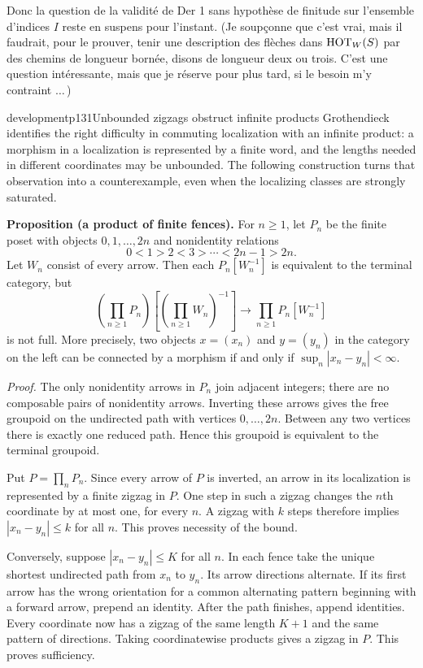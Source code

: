 Donc la question de la validité de Der 1 sans hypothèse de finitude sur l'ensemble d'indices $I$
reste en suspens pour l'instant. (Je soupçonne que c'est vrai, mais il faudrait, pour le prouver, tenir une description des flèches dans $\mathrm{HOT}_W(S)$ par des chemins de longueur bornée, disons de longueur deux ou trois. C'est une question intéressante, mais que je réserve pour plus tard, si le besoin m'y contraint $\ldots\,$)

\begin{dcomment}{development}{p131}{Unbounded zigzags obstruct infinite products}
Grothendieck identifies the right difficulty in commuting localization with an infinite product: a morphism in a localization is represented by a finite word, and the lengths needed in different coordinates may be unbounded. The following construction turns that observation into a counterexample, even when the localizing classes are strongly saturated.

\textbf{Proposition (a product of finite fences).}\ours
For $n\geq1$, let $P_n$ be the finite poset with objects $0,1,\ldots,2n$ and nonidentity relations
\[
 0<1>2<3>\cdots<2n-1>2n.
\]
Let $W_n$ consist of every arrow. Then each $P_n[W_n^{-1}]$ is equivalent to the terminal category, but
\[
 \left(\prod_{n\geq1}P_n\right)
 \left[\left(\prod_{n\geq1}W_n\right)^{-1}\right]
 \longrightarrow \prod_{n\geq1}P_n[W_n^{-1}]
\]
is not full. More precisely, two objects $x=(x_n)$ and $y=(y_n)$ in the category on the left can be connected by a morphism if and only if $\sup_n|x_n-y_n|<\infty$.

\textit{Proof.} The only nonidentity arrows in $P_n$ join adjacent integers; there are no composable pairs of nonidentity arrows. Inverting these arrows gives the free groupoid on the undirected path with vertices $0,\ldots,2n$. Between any two vertices there is exactly one reduced path. Hence this groupoid is equivalent to the terminal groupoid.

Put $P=\prod_nP_n$. Since every arrow of $P$ is inverted, an arrow in its localization is represented by a finite zigzag in $P$. One step in such a zigzag changes the $n$th coordinate by at most one, for every $n$. A zigzag with $k$ steps therefore implies $|x_n-y_n|\leq k$ for all $n$. This proves necessity of the bound.

Conversely, suppose $|x_n-y_n|\leq K$ for all $n$. In each fence take the unique shortest undirected path from $x_n$ to $y_n$. Its arrow directions alternate. If its first arrow has the wrong orientation for a common alternating pattern beginning with a forward arrow, prepend an identity. After the path finishes, append identities. Every coordinate now has a zigzag of the same length $K+1$ and the same pattern of directions. Taking coordinatewise products gives a zigzag in $P$. This proves sufficiency.


\end{dcomment}
